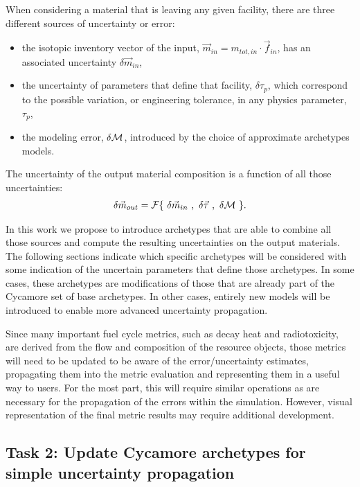 \documentclass[dvips,12pt]{article}
\newcommand{\unc}[1]
{ \delta #1 }
\begin{document}
When considering a material that is leaving any
given facility, there are three different sources
of uncertainty or error:
\begin{itemize}
\item the isotopic inventory vector of the input,
  $\vec{m}_{in} = m_{tot,in} \cdot \vec{f}_{in}$,
  has an associated uncertainty $\unc{\vec{m}_{in}}$,
\item the uncertainty of parameters that define
that facility, $\unc{\tau_p}$, which correspond to
the possible  variation, or engineering tolerance,
in any physics parameter, $\tau_p$,
\item the modeling error, $\unc{{\cal M}}$,
introduced by the choice of approximate archetypes
models.
\end{itemize}
The uncertainty of the output material composition
is a function of all those uncertainties:
\begin{align}
  \delta \vec{m}_{out} = 
         {\cal F}\{~\unc{\vec{m}_{in}}~,~\unc{\vec{\tau}}~,~\unc{{\cal M}}~\}.
\end{align}

In this work we propose to introduce archetypes
that are able to combine all those sources and
compute the resulting uncertainties on the output
materials.  The following sections indicate which
specific archetypes will be considered with some
indication of the uncertain parameters that define
those archetypes.  In some cases, these archetypes
are modifications of those that are already part
of the Cycamore set of base archetypes.  In other
cases, entirely new models will be introduced to
enable more advanced uncertainty propagation.

Since many important fuel cycle metrics, such as
decay heat and radiotoxicity, are derived from the
flow and composition of the resource objects,
those metrics will need to be updated to be aware
of the error/uncertainty estimates, propagating
them into the metric evaluation and representing
them in a useful way to users.  For the most part,
this will require similar operations as are
necessary for the propagation of the errors within
the simulation.  However, visual representation of
the final metric results may require additional
development.

\subsection{Task 2: Update Cycamore archetypes for simple uncertainty propagation}
\end{document}
